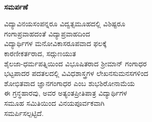 \thispagestyle{empty}
~
\vfill
\begin{mdframed}[roundcorner=10pt]
\phantom{i}
\medskip
{}
\centering
{\Large\bfseries ಸಮರ್ಪಣೆ}
\bigskip

ವಿದ್ಯಾವಿನಯಸಂಪನ್ನರೂ ವಿದ್ವತ್ಸಮೂಹದಲ್ಲಿ ವಿಶಿಷ್ಟರೂ \\ಗಂಗಾಪ್ರವಾಹದಂತೆ ವಿದ್ಯಾಪ್ರವಾಹದಿಂದ\\
ವಿದ್ಯಾರ್ಥಿಗಳ ಮನೋವಿಕಾಸರೂಪವಾದ ಫಲಕ್ಕೆ \\ಕಾರಣೀಕರ್ತರಾದ, ಸದ್ಗುಣಯುತ\\
ಶೈಲಜಾ-ಧರ್ಮಪತ್ನಿಯಿಂದ ವಿಭೂಷಿತರಾದ ಶ್ರೀಮಾನ್ ಗಂಗಾಧರ\\
ಭಟ್ಟಪಾದರ ಪದತಲದಲ್ಲಿ ವಿವಿಧಶಾಸ್ತ್ರಗಳ ಲೇಖನಸುಮನಸಗಳಿಂದ\\
ಶೋಭಿತವಾದ ಜ್ಞಾನಗಂಗಾಧರ ಎಂಬ ಶುಭಶಿರೋನಾಮೆಯ\\
ಈ ಗ್ರನ್ಥಹಾರವು, ಅವರ ಅತ್ಯಂತಪ್ರೀತಿಪಾತ್ರ ವಿದ್ಯಾರ್ಥಿಗಳ\\
ಸಮೂಹ ಸಮಿತಿಯಿಂದ ವಿನಯಪೂರ್ವಕವಾಗಿ\\
ಸಮರ್ಪಿಸಲ್ಪಟ್ಟಿದೆ.
\bigskip
\phantom{i}
\end{mdframed}
\vfill

